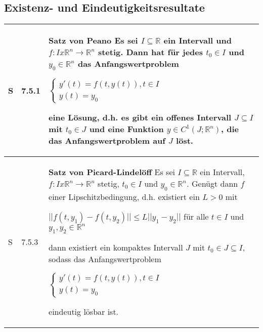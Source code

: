 \subsection{Existenz- und Eindeutigkeitsresultate}

    \begin{longtable}{p{0.75cm} p{1cm} p{16cm}}
        \toprule

        S   & 7.5.1 &   \textbf{Satz von Peano} \hfill \break
                        Es sei $I \subseteq \mathbb{R}$ ein Intervall und $f: I x \mathbb{R}^n \rightarrow \mathbb{R}^n$ stetig. Dann hat
                        für jedes $t_0 \in I$ und $y_0 \in \mathbb{R}^n$ das Anfangswertproblem \hfill \break
                        \centerline{$   \begin{cases}
                                        y'(t) = f(t,y(t)), t\in I \\
                                        y(t) = y_0 
                                        \end{cases} $} 
                        eine Lösung, d.h. es gibt ein offenes Intervall $J \subseteq I$ mit $t_0 \in J$ und eine Funktion $y \in C^1(J;\mathbb{R}^n)$, 
                        die das Anfangswertproblem auf $J$ löst. \\
        \midrule
        S   & 7.5.3 &   \textbf{Satz von Picard-Lindelöff} \hfill \break
                        Es sei $I \subseteq \mathbb{R}$ ein Intervall, $f: I x \mathbb{R}^n \rightarrow \mathbb{R}^n$ stetig, $t_0 \in I$ und 
                        $y_0 \in \mathbb{R}^n$. Genügt dann $f$ einer Lipschitzbedingung, d.h. existiert ein $L > 0$ mit \hfill \break
                        \centerline{$ ||f(t,y_1) -f(t,y_2)|| \leq L||y_1 - y_2||$ für alle $t\in I$ und $y_1,y_2 \in \mathbb{R}^n $}
                        dann existiert ein kompaktes Intervall $J$ mit $t_0 \in J \subseteq I$, sodass das Anfangswertproblem \hfill \break
                        \centerline{$   \begin{cases}
                                        y'(t) = f(t,y(t)), t\in I \\
                                        y(t) = y_0 
                                        \end{cases} $}
                        eindeutig lösbar ist. \\
        \bottomrule
    \end{longtable}
    

